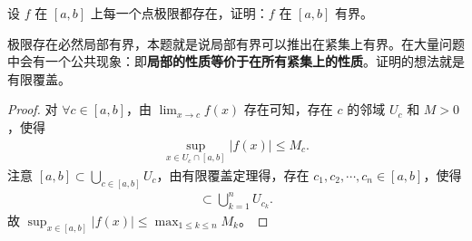 \documentclass[../../main.tex]{subfiles}
\begin{document}
\begin{example}
设 \(f\) 在 \([a,b]\) 上每一个点极限都存在，证明：\(f\) 在 \([a,b]\) 有界。
\end{example}
\begin{note}
极限存在必然局部有界，本题就是说局部有界可以推出在紧集上有界。在大量问题中会有一个公共现象：即\textbf{局部的性质等价于在所有紧集上的性质}。证明的想法就是有限覆盖。 
\end{note}
\begin{proof}
对 \(\forall c\in [a,b]\)，由 \(\lim_{x\rightarrow c}f(x)\) 存在可知，存在 \(c\) 的邻域 \(U_c\) 和 \(M>0\)，使得
\begin{align*}
\sup_{x\in U_c\cap [a,b]}|f(x)|\leqslant M_c.
\end{align*}
注意 \([a,b]\subset \bigcup_{c\in [a,b]}U_c\)，由有限覆盖定理得，存在 \(c_1,c_2,\cdots,c_n\in [a,b]\)，使得
\begin{align*}
[a,b]\subset \bigcup_{k = 1}^nU_{c_k}. 
\end{align*}
故 \(\sup_{x\in [a,b]}|f(x)|\leqslant \max_{1\leqslant k\leqslant n}M_k\)。 
\end{proof}
\end{document}
